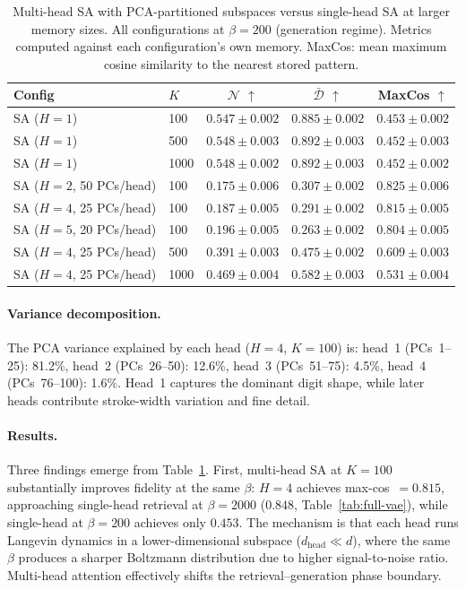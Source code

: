 \begin{table}[h]
\centering
\caption{Multi-head SA with PCA-partitioned subspaces versus single-head SA at larger memory sizes. All configurations at $\beta{=}200$ (generation regime). Metrics computed against each configuration's own memory. MaxCos: mean maximum cosine similarity to the nearest stored pattern.}
\label{tab:multihead}
\small
\begin{tabular}{@{}llccc@{}}
\toprule
Config & $K$ & $\mathcal{N}$ $\uparrow$ & $\bar{\mathcal{D}}$ $\uparrow$ & MaxCos $\uparrow$ \\
\midrule
SA ($H{=}1$) & 100  & $0.547 \pm 0.002$ & $0.885 \pm 0.002$ & $0.453 \pm 0.002$ \\
SA ($H{=}1$) & 500  & $0.548 \pm 0.003$ & $0.892 \pm 0.003$ & $0.452 \pm 0.003$ \\
SA ($H{=}1$) & 1000 & $0.548 \pm 0.002$ & $0.892 \pm 0.003$ & $0.452 \pm 0.002$ \\
\midrule
SA ($H{=}2$, 50 PCs/head)  & 100 & $0.175 \pm 0.006$ & $0.307 \pm 0.002$ & $0.825 \pm 0.006$ \\
SA ($H{=}4$, 25 PCs/head)  & 100 & $0.187 \pm 0.005$ & $0.291 \pm 0.002$ & $0.815 \pm 0.005$ \\
SA ($H{=}5$, 20 PCs/head)  & 100 & $0.196 \pm 0.005$ & $0.263 \pm 0.002$ & $0.804 \pm 0.005$ \\
\midrule
SA ($H{=}4$, 25 PCs/head) & 500  & $0.391 \pm 0.003$ & $0.475 \pm 0.002$ & $0.609 \pm 0.003$ \\
SA ($H{=}4$, 25 PCs/head) & 1000 & $0.469 \pm 0.004$ & $0.582 \pm 0.003$ & $0.531 \pm 0.004$ \\
\bottomrule
\end{tabular}
\end{table}

\paragraph{Variance decomposition.}
The PCA variance explained by each head ($H{=}4$, $K{=}100$) is: head~1 (PCs~1--25): 81.2\%, head~2 (PCs~26--50): 12.6\%, head~3 (PCs~51--75): 4.5\%, head~4 (PCs~76--100): 1.6\%. Head~1 captures the dominant digit shape, while later heads contribute stroke-width variation and fine detail.

\paragraph{Results.}
Three findings emerge from Table~\ref{tab:multihead}. First, multi-head SA at $K{=}100$ substantially improves fidelity at the same $\beta$: $H{=}4$ achieves max-cos~$= 0.815$, approaching single-head retrieval at $\beta{=}2000$ ($0.848$, Table~\ref{tab:full-vae}), while single-head at $\beta{=}200$ achieves only $0.453$. The mechanism is that each head runs Langevin dynamics in a lower-dimensional subspace ($d_{\mathrm{head}} \ll d$), where the same $\beta$ produces a sharper Boltzmann distribution due to higher signal-to-noise ratio. Multi-head attention effectively shifts the retrieval--generation phase boundary.

